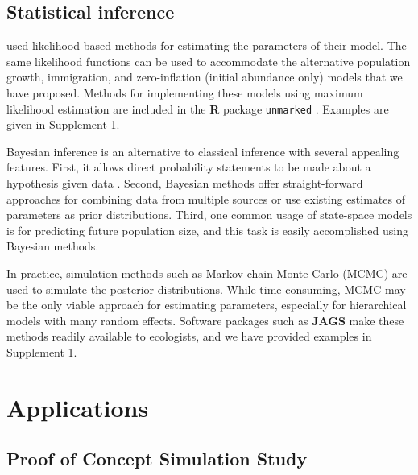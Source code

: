 \documentclass[12pt,english]{article}
\begin{document}
\begin{spacing}{1.9}
\begin{flushleft}
\subsection*{Statistical inference}

\citet{dail_madsen:2011} used likelihood based methods for estimating
the parameters of their model. The same likelihood functions can be
used to accommodate the alternative population growth, immigration, and 
zero-inflation (initial abundance only) models that we
have proposed. Methods for implementing these models using maximum 
likelihood estimation are included in the 
\textbf{R} package \texttt{unmarked} \citep{fiske_chandler:2011}. Examples
are given in Supplement 1.

Bayesian inference is an alternative to classical inference with
several appealing features. First, it allows direct probability
statements to be made about a hypothesis given data
\citep{link_barker:2010}.  Second, Bayesian methods offer
straight-forward approaches for combining data from multiple sources
or use existing estimates of parameters as prior distributions. Third,
one common usage of state-space models is for predicting future
population size, and this task is easily accomplished using Bayesian
methods.

In
practice, simulation methods such as Markov chain Monte Carlo (MCMC)
are used to simulate the posterior distributions. While time
consuming, MCMC may be the only viable approach for estimating
parameters, especially for hierarchical models with many random
effects.  
Software packages such as 
\textbf{JAGS} \citep{plummer:2003} make these methods readily
available to ecologists, and we have provided examples in 
Supplement 1. 


\section*{Applications}
\label{sec:app}

\subsection*{Proof of Concept Simulation Study}



\end{flushleft}
\end{spacing}
\end{document}
